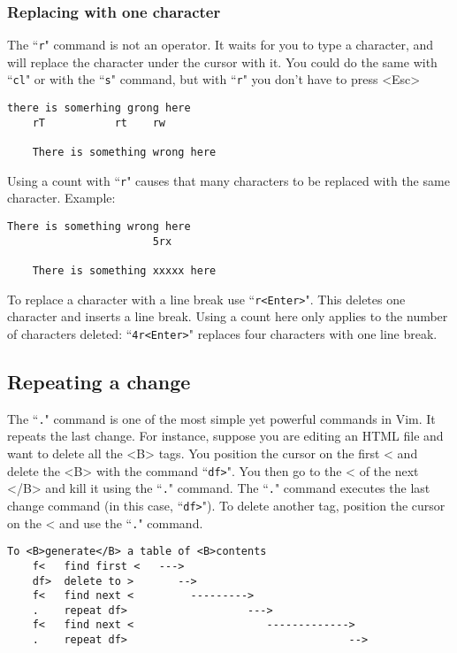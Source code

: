 \subsubsection{Replacing with one character}

The ``\texttt{r}" command is not an operator.
It waits for you to type a character, and will replace the character under the cursor with it.
You could do the same with ``\texttt{cl}" or with the ``\texttt{s}" command, but with ``\texttt{r}" you don't have to press <Esc>

\begin{Verbatim}[samepage=true]
    there is somerhing grong here
    rT           rt    rw

    There is something wrong here
\end{Verbatim}

Using a count with ``\texttt{r}" causes that many characters to be replaced with the same character.
Example:

\begin{Verbatim}[samepage=true]
    There is something wrong here
                       5rx

    There is something xxxxx here
\end{Verbatim}

To replace a character with a line break use ``\texttt{r<Enter>}".
This deletes one character and inserts a line break.
Using a count here only applies to the number of characters deleted: ``\texttt{4r<Enter>}" replaces four characters with one line break.

\subsection{Repeating a change}

The ``\texttt{.}" command is one of the most simple yet powerful commands in Vim.
It repeats the last change.
For instance, suppose you are editing an HTML file and want to delete all the <B> tags.
You position the cursor on the first < and delete the <B> with the command ``\texttt{df>}".
You then go to the < of the next </B> and kill it using the ``\texttt{.}" command.
The ``\texttt{.}" command executes the last change command (in this case, ``\texttt{df>}").
To delete another tag, position the cursor on the < and use the ``\texttt{.}" command.

\begin{Verbatim}[samepage=true]
                        To <B>generate</B> a table of <B>contents
    f<   find first <   --->
    df>  delete to >       -->
    f<   find next <         --------->
    .    repeat df>                   --->
    f<   find next <                     ------------->
    .    repeat df>                                   -->
\end{Verbatim}

